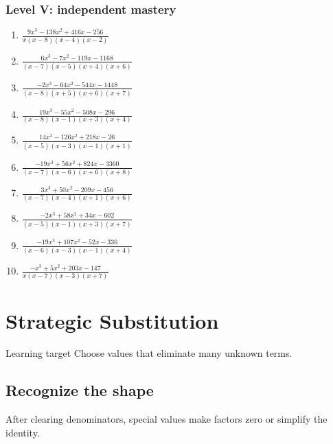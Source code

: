 \documentclass[11pt,oneside]{book}
\begin{document}
\subsection*{Level V: independent mastery}
\begin{enumerate}[leftmargin=*,label=\textbf{\arabic*.},itemsep=0.65\baselineskip]
\item $\displaystyle \frac{9 x^{3} - 138 x^{2} + 416 x - 256}{x \left(x - 8\right) \left(x - 4\right) \left(x - 2\right)}$
\item $\displaystyle \frac{6 x^{3} - 7 x^{2} - 119 x - 1168}{\left(x - 7\right) \left(x - 5\right) \left(x + 4\right) \left(x + 6\right)}$
\item $\displaystyle \frac{- 2 x^{3} - 64 x^{2} - 544 x - 1448}{\left(x - 8\right) \left(x + 5\right) \left(x + 6\right) \left(x + 7\right)}$
\item $\displaystyle \frac{19 x^{3} - 55 x^{2} - 508 x - 296}{\left(x - 8\right) \left(x - 1\right) \left(x + 3\right) \left(x + 4\right)}$
\item $\displaystyle \frac{14 x^{3} - 126 x^{2} + 218 x - 26}{\left(x - 5\right) \left(x - 3\right) \left(x - 1\right) \left(x + 1\right)}$
\item $\displaystyle \frac{- 19 x^{3} + 56 x^{2} + 824 x - 3360}{\left(x - 7\right) \left(x - 6\right) \left(x + 6\right) \left(x + 8\right)}$
\item $\displaystyle \frac{3 x^{3} + 50 x^{2} - 209 x - 456}{\left(x - 7\right) \left(x - 4\right) \left(x + 1\right) \left(x + 6\right)}$
\item $\displaystyle \frac{- 2 x^{3} + 58 x^{2} + 34 x - 602}{\left(x - 5\right) \left(x - 1\right) \left(x + 3\right) \left(x + 7\right)}$
\item $\displaystyle \frac{- 19 x^{3} + 107 x^{2} - 52 x - 336}{\left(x - 6\right) \left(x - 3\right) \left(x - 1\right) \left(x + 4\right)}$
\item $\displaystyle \frac{- x^{3} + 5 x^{2} + 203 x - 147}{x \left(x - 7\right) \left(x - 3\right) \left(x + 7\right)}$
\end{enumerate}
\chapter{Strategic Substitution}
\begin{rulebox}{Learning target}
Choose values that eliminate many unknown terms.
\end{rulebox}
\section{Recognize the shape}
After clearing denominators, special values make factors zero or simplify the identity.
\end{document}

